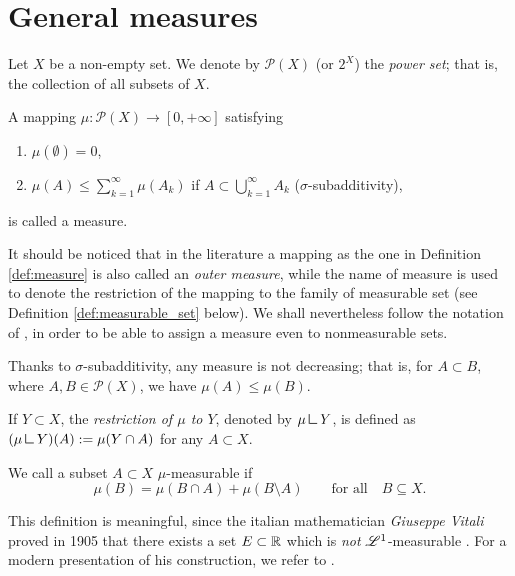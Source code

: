 \section{General measures}

Let $X$ be a non-empty set. We denote by $\mathcal{P}(X)$ (or $2^X$) the
\emph{power set}; that is, the collection of all subsets of $X$.

\begin{definition}[Measures] \label{def:measure}
A mapping $\mu : \mathcal{P}(X) \to [0,+\infty]$ satisfying
\begin{enumerate}[(1)]
\item $\mu(\emptyset) = 0$, 
\item $\mu(A) \leq \sum_{k=1}^\infty \mu(A_k)$ if $A \subset
\bigcup_{k=1}^\infty A_k$ ($\sigma$-subadditivity),
\end{enumerate}
is called a measure.
\end{definition}

It should be noticed that in the literature a mapping as the one in Definition \ref{def:measure} is also called an {\em outer measure}, while the name of measure is used to denote the restriction of the mapping to the family of measurable set (see Definition \ref{def:measurable_set} below). We shall nevertheless follow the notation of \cite{evans2015measure}, in order to be able to assign a measure even to nonmeasurable sets.

\begin{remark}
Thanks to $\sigma$-subadditivity, any measure is not decreasing; that is, for $A\subset B$, where $A,B \in \mathcal{P}(X)$, we have $\mu(A) \leq \mu(B)$. 
\end{remark}

\begin{definition} If $Y \subset X$, the
\emph{restriction of $\mu$ to $Y$}, denoted by $\mu \res Y$,
is defined as $(\mu \res Y)(A) := \mu(Y\cap A)$ for any $A \subset X$.
\end{definition}

\begin{definition} \label{def:measurable_set} 
We call a subset $A \subset X$
$\mu$-measurable if 
\[
\mu(B) = \mu(B\cap A) + \mu(B \setminus A)
\qquad \text{for all} \quad B \subseteq X.
\]
\end{definition}

\begin{remark}
This definition is meaningful, since the italian mathematician \emph{Giuseppe Vitali} proved in 1905 that there exists a set
$E \subset \mathbb{R}$ which is \emph{not} $\mathscr{L}^{1}$-measurable \cite{vitali1905sul}. For a modern presentation of his construction, we refer to \cite[Section I.1.2]{maggi2012sets}.
\end{remark}

